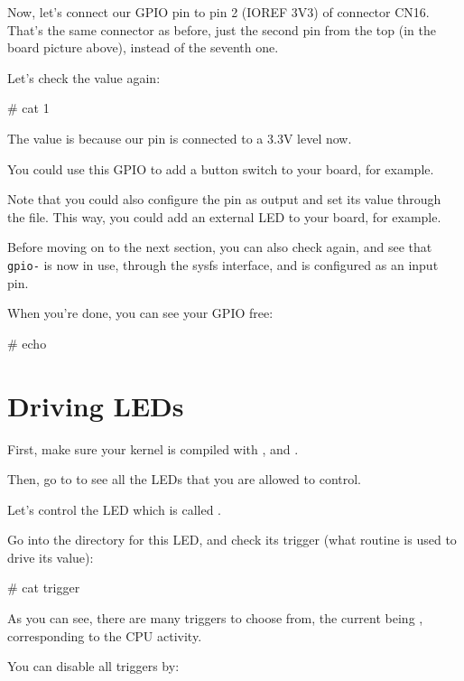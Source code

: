 {Now, let's connect our GPIO pin to pin 2 (IOREF 3V3) of connector CN16.
That's the same connector as before, just the second pin from the top
(in the board picture above), instead of the seventh one.

Let's check the value again:

\begin{bashinput}
# cat %
1
\end{bashinput}

The value is  because our pin is connected to a 3.3V level now.

You could use this GPIO to add a button switch to your board, for
example.

Note that you could also configure the pin as output and set its value
through the  file. This way, you could add an external LED
to your board, for example.

Before moving on to the next section, you can also check
 again, and see that {\tt gpio-\gpionum} is now
in use, through the sysfs interface, and is configured as an input pin.

When you're done, you can see your GPIO free:

\begin{bashinput}
# echo %
\end{bashinput}

\section{Driving LEDs}

First, make sure your kernel is compiled with
, 
and .

Then, go to  to see all the LEDs that you are allowed
to control.

Let's control the LED which is called
.

Go into the directory for this LED, and check its trigger (what
routine is used to drive its value):

\begin{bashinput}
# cat trigger
\end{bashinput}

As you can see, there are many triggers to choose from, the current
being , corresponding to the CPU activity.

You can disable all triggers by:

}
